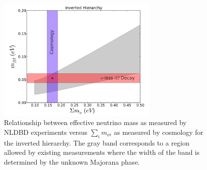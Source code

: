 \begin{figure}[h!]
\centering \includegraphics[width=0.70\textwidth]{Neutrinos/IH_MajoranaPhase.png}
\caption{Relationship between effective neutrino mass as measured by NLDBD experiments versus $\sum_i m_{\nu i}$ as measured by cosmology for the inverted hierarchy. The gray band corresponds to a region allowed by existing measurements where the width of the band is determined by the unknown Majorana phase. }
\label{fig:MajoranaPhase}
\end{figure}



